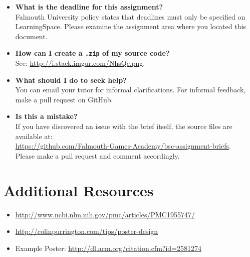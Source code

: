 \documentclass{../fal_assignment}
\begin{document}
\begin{itemize}
	\item 	\textbf{What is the deadline for this assignment?} \\ 
    		Falmouth University policy states that deadlines must only be specified on LearningSpace. Please examine the assignment area where you located this document.
    		
    	\item 	\textbf{How can I create a \texttt{.zip} of my source code?} \\ 
    		See: \url{http://i.stack.imgur.com/NhsQe.png}. 
    		
	\item 	\textbf{What should I do to seek help?} \\ 
    		You can email your tutor for informal clarifications. For informal feedback, make a pull request on GitHub. 
    		
    	\item 	\textbf{Is this a mistake?} \\ 	
    		If you have discovered an issue with the brief itself, the source files are available at: \\
    		\url{https://github.com/Falmouth-Games-Academy/bsc-assignment-briefs}.\\
    		 Please make a pull request and comment accordingly.
\end{itemize}

\section*{Additional Resources}

\begin{itemize}
    \item \url{http://www.ncbi.nlm.nih.gov/pmc/articles/PMC1955747/}
    \item \url{http://colinpurrington.com/tips/poster-design}
    \item Example Poster: \url{http://dl.acm.org/citation.cfm?id=2581274}
\end{itemize}
\end{document}
